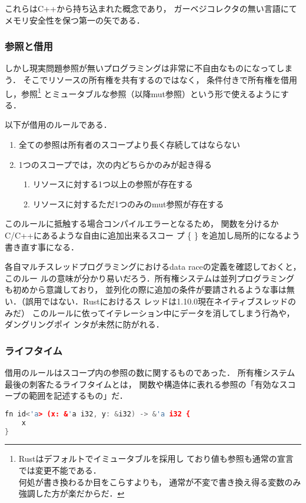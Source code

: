 これらはC++から持ち込まれた概念であり，
ガーベジコレクタの無い言語にてメモリ安全性を保つ第一の矢である．

\subsubsection{参照と借用}
しかし現実問題参照が無いプログラミングは非常に不自由なものになってしまう．
そこでリソースの所有権を共有するのではなく，
条件付きで所有権を借用し，参照\footnote{Rustはデフォルトでイミュータブルを採用し
  ており値も参照も通常の宣言では変更不能である．\\
  何処が書き換わるか目をこらすよりも，
  通常が不変で書き換え得る変数のみ強調した方が楽だからだ．
}
とミュータブルな参照（以降mut参照）という形で使えるようにする．

以下が借用のルールである．
\begin{enumerate}
  \item 全ての参照は所有者のスコープより長く存続してはならない
  \item 1つのスコープでは，次の内どちらかのみが起き得る
    \begin{enumerate}
      \item リソースに対する1つ以上の参照が存在する
      \item リソースに対するただ1つのみのmut参照が存在する
    \end{enumerate}
\end{enumerate}
このルールに抵触する場合コンパイルエラーとなるため，
関数を分けるかC/C++にあるような自由に追加出来るスコー
プ \{ \} を追加し局所的になるよう書き直す事になる．

各自マルチスレッドプログラミングにおけるdata raceの定義を確認しておくと，このルー
ルの意味が分かり易いだろう．所有権システムは並列プログラミングも初めから意識しており，
並列化の際に追加の条件が要請されるような事は無い．（誤用ではない．Rustにおけるス
レッドは1.10.0現在ネイティブスレッドのみだ）
このルールに依ってイテレーション中にデータを消してしまう行為や，ダングリングポイ
ンタが未然に防がれる．

\subsubsection{ライフタイム}
借用のルールはスコープ内の参照の数に関するものであった．
所有権システム最後の刺客たるライフタイムとは，
関数や構造体に表れる参照の「有効なスコープの範囲を記述するもの」だ．

\begin{lstlisting}[language={C++},caption=関数のライフタイム,label=lifetime_fn]
fn id<'a> (x: &'a i32, y: &i32) -> &'a i32 {
    x
}
\end{lstlisting}

